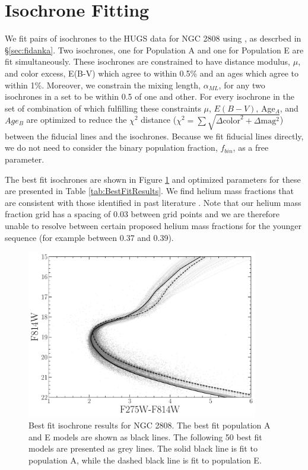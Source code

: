 \section{Isochrone Fitting}\label{sec:isoFit}
We fit pairs of isochrones to the HUGS data for NGC 2808 using \fidanka, as
descrbed in \S \ref{sec:fidanka}. Two isochrones, one for Population A and one
for Population E are fit simultaneously. These isochrones are constrained to
have distance modulus, $\mu$, and color excess, E(B-V) which agree to within
0.5\% and an ages which agree to within 1\%. Moreover, we constrain the mixing length, $\alpha_{ML}$, for any two
isochrones in a set to be within 0.5 of one and other. For every isochrone in
the set of combination of which fulfilling these constraints $\mu$, $E(B-V)$,
Age$_{A}$, and $Age_{B}$ are optimized to reduce the $\chi^{2}$ distance
($\chi^{2} = \sum\sqrt{\Delta \text{color}^{2} + \Delta \text{mag} ^{2}}$)
between the fiducial lines and the isochrones. Because we fit fiducial lines
directly, we do not need to consider the binary population fraction, $f_{bin}$,
as a free parameter.

The best fit isochrones are shown in Figure \ref{fig:BestFitResults} and
optimized parameters for these are presented in Table \ref{tab:BestFitResults}.
We find helium mass fractions that are consistent with those identified in past
literature \citep[e.g.][]{Milone2015}. Note that our helium mass fraction grid
has a spacing of 0.03 between grid points and we are therefore unable to
resolve between certain proposed helium mass fractions for the younger sequence
(for example between 0.37 and 0.39).

\begin{figure}
  \centering
  \includegraphics[width=0.9\textwidth]{BestFitResults.pdf}
  \caption{Best fit isochrone results for NGC 2808. The best fit population A
  and E models are shown as black lines. The following 50 best fit models are
  presented as grey lines. The solid black line is fit to population A, while
  the dashed black line is fit to population E.}
  \label{fig:BestFitResults}
\end{figure}

